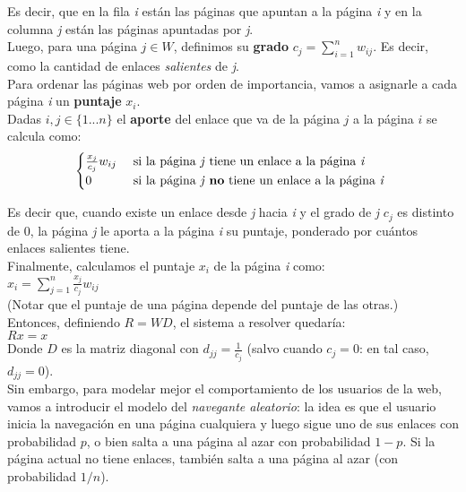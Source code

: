 Es decir, que en la fila \textit{i} están las páginas que apuntan a la página \textit{i} y en la columna \textit{j} están las páginas apuntadas por \textit{j}. \\

Luego, para una página $j \in W$, definimos su \textbf{grado} $c_{j} = \sum_{i = 1}^{n} w_{ij}$. Es decir, como la cantidad de enlaces \textit{salientes} de \textit{j}. \\

Para ordenar las páginas web por orden de importancia, vamos a asignarle a cada página \textit{i} un \textbf{puntaje} $x_i$. \\

Dadas $i, j \in \{1...n\}$ el \textbf{aporte} del enlace que va de la página $j$ a la página $i$ se calcula como: \\

\[
	\begin{cases}
		\frac{x_j}{c_j}w_{ij} 	& \text{ si la página \textit{j} tiene un enlace a la página \textit{i} } \\
		0 			& \text{ si la página \textit{j} \textbf{no} tiene un enlace a la página \textit{i} } \\
	\end{cases}
\]

Es decir que, cuando existe un enlace desde \textit{j} hacia \textit{i} y el grado de \textit{j} $c_j$ es distinto de $0$, la página \textit{j} le aporta a la página \textit{i} su puntaje, ponderado por cuántos enlaces salientes tiene. \\

Finalmente, calculamos el puntaje $x_i$ de la página \textit{i} como: \\

$ x_i = \sum_{j=1}^{n} \frac{x_j}{c_j} w_{ij} $ \\

(Notar que el puntaje de una página depende del puntaje de las otras.) \\

Entonces, definiendo $R = WD$, el sistema a resolver quedaría: \\

$Rx = x$ \\

Donde $D$ es la matriz diagonal con $d_{jj} = \frac{1}{c_j}$ (salvo cuando $c_j = 0$: en tal caso, $d_{jj} = 0$). \\

Sin embargo, para modelar mejor el comportamiento de los usuarios de la web, vamos a introducir el modelo del \textit{navegante aleatorio}: la idea es que el usuario inicia la navegación en una página cualquiera y luego sigue uno de sus enlaces con probabilidad $p$, o bien salta a una página al azar con probabilidad $1 - p$. Si la página actual no tiene enlaces, también salta a una página al azar (con probabilidad $1/n$). \\

